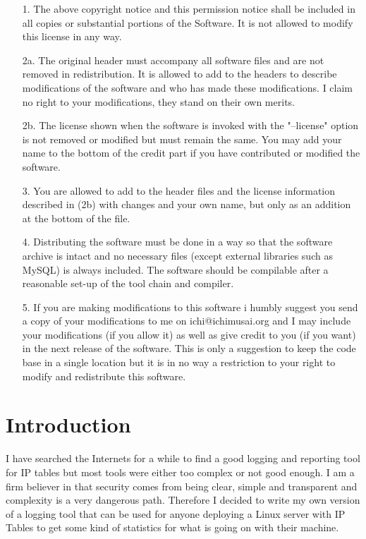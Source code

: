 \documentclass[english,twoside,openright,a4paper,12pt]{article}
\begin{document}
\begin{itemize}
\item[1.] The above copyright notice and this permission notice shall be included in all copies or substantial portions of the Software. It is not allowed to modify this license in any way.
  
\item[2a.] The original header must accompany all software files and are not removed in redistribution. It is allowed to add to the headers to describe modifications of the software and who has made these modifications. I claim no right to your modifications, they stand on their own merits.
 
\item[2b.] The license shown when the software is invoked with the "--license" option is not removed or modified but must remain the same. You may add your name to the bottom of the credit part if you have contributed or modified the software.
 
\item[3.] You are allowed to add to the header files and the license information described in (2b) with changes and your own name, but only as an addition at the bottom of the file.
 
\item[4.] Distributing the software must be done in a way so that the software archive is intact and no necessary files (except external libraries such as MySQL) is always included. The software should be compilable after a reasonable set-up of the tool chain and compiler.
 
\item[5.] If you are making modifications to this software i humbly suggest you send a copy of your modifications to me on ichi@ichimusai.org and I may include your modifications (if you allow it) as well as give credit to you (if you want) in the next release of the software. This is only a suggestion to keep the code base in a single location but it is in no way a restriction to your right to modify and redistribute this software.

\end{itemize}



\section{Introduction}

I have searched the Internets for a while to find a good logging and reporting tool for IP tables but most tools were either too complex or not good enough. I am a firm believer in that security comes from being clear, simple and transparent and complexity is a very dangerous path. Therefore I decided to write my own version of a logging tool that can be used for anyone deploying a Linux server with IP Tables to get some kind of statistics for what is going on with their machine.
\end{document}
